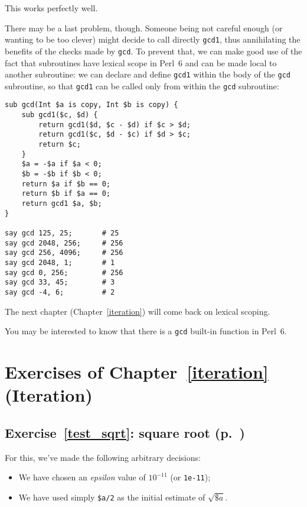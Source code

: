 This works perfectly well.

There may be a last problem, though. Someone being not 
careful enough (or wanting to be too clever) might decide 
to call directly {\tt gcd1}, thus annihilating the benefits 
of the checks made by {\tt gcd}. To prevent that, we can make good 
use of the fact that subroutines have lexical scope in Perl~6 
and can be made local to another subroutine: we can declare 
and define {\tt gcd1} within the body of the {\tt gcd} 
subroutine, so that {\tt gcd1} can be called only from 
within the {\tt gcd} subroutine:

\begin{verbatim}
sub gcd(Int $a is copy, Int $b is copy) { 
    sub gcd1($c, $d) {
        return gcd1($d, $c - $d) if $c > $d;
        return gcd1($c, $d - $c) if $d > $c;
        return $c;
    }
    $a = -$a if $a < 0;
    $b = -$b if $b < 0;
    return $a if $b == 0;
    return $b if $a == 0;
    return gcd1 $a, $b;
}

say gcd 125, 25;       # 25
say gcd 2048, 256;     # 256
say gcd 256, 4096;     # 256
say gcd 2048, 1;       # 1
say gcd 0, 256;        # 256
say gcd 33, 45;        # 3
say gcd -4, 6;         # 2
\end{verbatim}

The next chapter (Chapter~\ref{iteration}) will come back 
on lexical scoping.


You may be interested to know that there is a {\tt gcd} built-in 
function in Perl~6.


\section{Exercises of Chapter~\ref{iteration} (Iteration)}

\subsection{Exercise~\ref{test_sqrt}: square root (p.~\pageref{test_sqrt})}
\label{sol_test_sqrt}

For this, we've made the following arbitrary decisions:
\begin{itemize}
\item We have chosen an \emph{epsilon} value of $10^{-11}$ (or {\tt 1e-11});
\item We have used simply \verb'$a/2' as the initial estimate 
of $\sqrt{\$a}$. 
\end{itemize}

